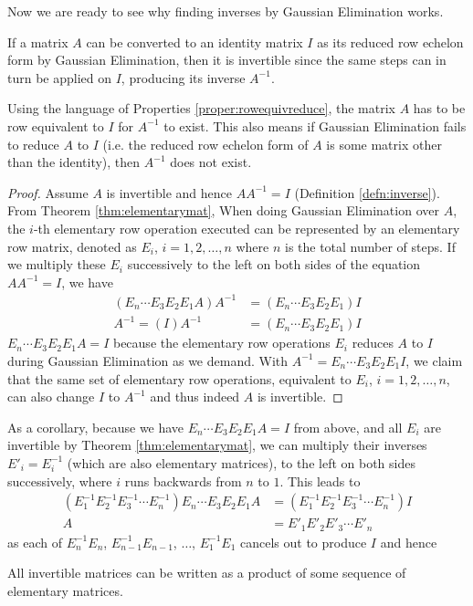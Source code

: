 Now we are ready to see why finding inverses by Gaussian Elimination works.
\begin{thm}
\label{thm:Gausselimprincip}
If a matrix $A$ can be converted to an identity matrix $I$ as its reduced row echelon form by Gaussian Elimination, then it is invertible since the same steps can in turn be applied on $I$, producing its inverse $A^{-1}$. 
\end{thm}
Using the language of Properties \ref{proper:rowequivreduce}, the matrix $A$ has to be row equivalent to $I$ for $A^{-1}$ to exist. This also means if Gaussian Elimination fails to reduce $A$ to $I$ (i.e. the reduced row echelon form of $A$ is some matrix other than the identity), then $A^{-1}$ does not exist.
\begin{proof}
Assume $A$ is invertible and hence $AA^{-1} = I$ (Definition \ref{defn:inverse}). From Theorem \ref{thm:elementarymat}, When doing Gaussian Elimination over $A$, the $i$-th elementary row operation executed can be represented by an elementary row matrix, denoted as $E_{i}$, $i = 1,2,\ldots,n$ where $n$ is the total number of steps. If we multiply these $E_{i}$ successively to the left on both sides of the equation $AA^{-1} = I$, we have
\begin{align*}
(E_n \cdots E_{3}E_{2}E_{1} A)A^{-1} &= (E_n \cdots E_{3}E_{2}E_{1})I \\
A^{-1} = (I)A^{-1} &= (E_n \cdots E_{3}E_{2}E_{1})I
\end{align*}
$E_n \cdots E_{3}E_{2}E_{1}A = I$ because the elementary row operations $E_i$ reduces $A$ to $I$ during Gaussian Elimination as we demand. With $A^{-1} = E_n \cdots E_{3}E_{2}E_{1}I$, we claim that the same set of elementary row operations, equivalent to $E_i$, $i = 1,2,\ldots,n$, can also change $I$ to $A^{-1}$ and thus indeed $A$ is invertible.    
\end{proof}
As a corollary, because we have $E_n \cdots E_{3}E_{2}E_{1}A = I$ from above, and all $E_i$ are invertible by Theorem \ref{thm:elementarymat}, we can multiply their inverses $E'_i = E_i^{-1}$ (which are also elementary matrices), to the left on both sides successively, where $i$ runs backwards from $n$ to $1$. This leads to
\begin{align*}
(E_{1}^{-1}E_{2}^{-1}E_{3}^{-1}\cdots E_n^{-1})E_n \cdots E_{3}E_{2}E_{1}A &= (E_{1}^{-1}E_{2}^{-1}E_{3}^{-1}\cdots E_n^{-1})I \\
A &= E'_{1}E'_{2}E'_{3}\cdots E'_n
\end{align*}
as each of $E_n^{-1}E_n$, $E_{n-1}^{-1}E_{n-1}$, $\ldots$, $E_1^{-1}E_1$ cancels out to produce $I$ and hence
\begin{proper}
\label{proper:invseqelement}
All invertible matrices can be written as a product of some sequence of elementary matrices.
\end{proper}

